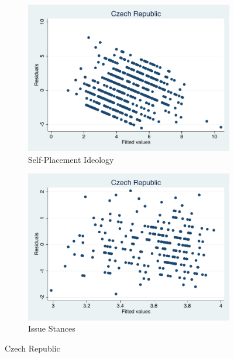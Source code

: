 \documentclass[12pt, titlepage]{article}
\begin{document}
\begin{figure}[H]
	\centering
	\begin{subfigure}[b]{0.475\textwidth}   
		\centering 
		\includegraphics[width=\textwidth]{Residuals/CountryIdeo/Czech}
		\caption{Self-Placement Ideology}
	\end{subfigure}
	\hfill
	\begin{subfigure}[b]{0.475\textwidth}
		\centering 
		\includegraphics[width=\textwidth]{Residuals/CountryLib/Czech}
		\caption{Issue Stances}
	\end{subfigure}
	\caption{Czech Republic}
	\label{Czech}
\end{figure}
\end{document}
